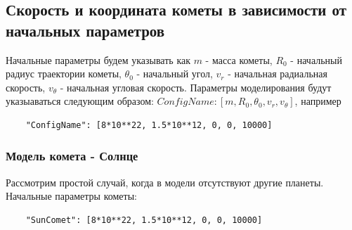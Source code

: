 \subsection{Скорость и координата кометы в зависимости от начальных параметров}
Начальные параметры будем указывать как $m$ - масса кометы, $R_0$ - начальный радиус
траектории кометы, $\theta_0$ - начальный угол, $v_r$ - начальная радиальная скорость,
$v_\theta$ - начальная угловая скорость.
Параметры моделирования будут указыаваться следующим образом:
$ConfigName: [m, R_0, \theta_0, v_r, v_\theta]$, например
\begin{lstlisting}
	"ConfigName": [8*10**22, 1.5*10**12, 0, 0, 10000]
\end{lstlisting}


\subsubsection*{Модель комета - Солнце}
Рассмотрим простой случай, когда в модели отсутствуют другие планеты. Начальные параметры кометы:
\begin{lstlisting}
	"SunComet": [8*10**22, 1.5*10**12, 0, 0, 10000]
\end{lstlisting}

